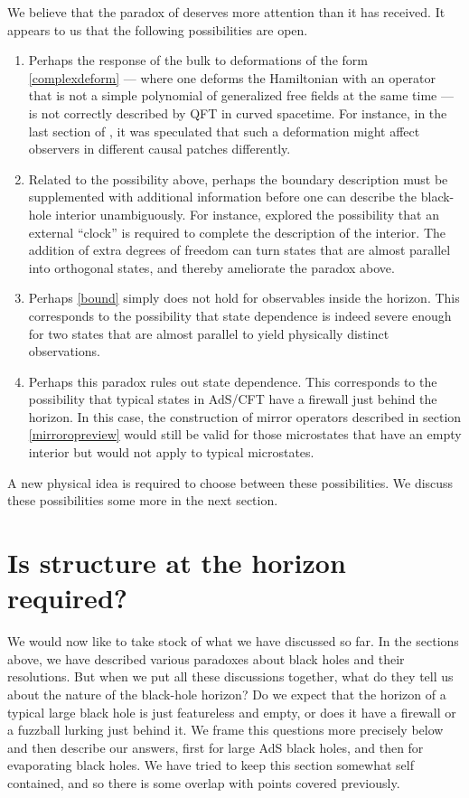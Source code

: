 \documentclass[12pt]{article}
\begin{document}
We believe that the paradox of \cite{Marolf:2015dia} deserves more attention than it has received. It appears to us that the following possibilities are open.
\begin{enumerate}
\item
Perhaps the response of the bulk to deformations of the form \eqref{complexdeform} --- where one deforms the Hamiltonian with an operator that is not a simple polynomial of generalized free fields at the same time  ---  is not correctly described by QFT in curved spacetime. For instance, in the last section of \cite{Raju:2016vsu}, it was speculated that such a deformation might affect observers in different causal patches differently.
\item
\label{possadditional}
Related to the possibility above, perhaps the boundary description must be supplemented with additional information before one can describe the black-hole interior unambiguously. For instance, \cite{vanBreukelen:2019zxq} explored the possibility that an external ``clock'' is required to complete the description of the interior. The addition of extra degrees of freedom can turn states that are almost parallel into orthogonal states, and thereby ameliorate the paradox above.
\item
Perhaps \eqref{bound} simply does not hold for observables inside the horizon. This corresponds to the possibility that state dependence is indeed severe enough for two states that are almost parallel to yield physically distinct observations.
\item
Perhaps this paradox  rules out state dependence. This corresponds to the possibility that typical states in AdS/CFT have a firewall just behind the horizon. In this case, the construction of mirror operators described in section \ref{mirroropreview} would still be valid for those microstates that have an empty interior but would not apply to typical microstates.
\end{enumerate}
A new physical idea is required to choose between these possibilities. We discuss these possibilities some more in the next section.

\section{Is structure at the horizon required? \label{secisstructure}}

We would now like to take stock of what we have discussed so far. In the sections above, we have described various paradoxes about black holes and their resolutions.  But when we put all these discussions together, what do they tell us about the nature of the black-hole horizon? Do we expect that the horizon of a typical large black hole is just featureless and empty, or does it have a firewall or a fuzzball lurking just behind it. We frame this questions more precisely below and then describe our answers, first for large AdS black holes, and then for evaporating black holes.  We have tried to keep this section somewhat self contained, and so there is some overlap with points covered previously.
\end{document}
